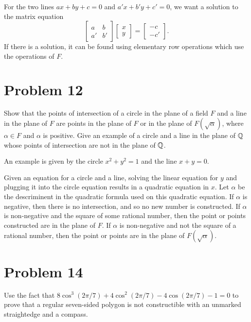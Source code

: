 \documentclass{article}
\begin{document}
For the two lines $ax+by+c=0$ and $a'x+b'y+c'=0$, we want a solution to the
matrix equation
\begin{equation*}
\left[\begin{array}{cc} a & b \\ a' & b' \end{array}\right]
\left[\begin{array}{c} x \\ y \end{array}\right] =
\left[\begin{array}{c} -c \\ -c' \end{array}\right].
\end{equation*}
If there is a solution, it can be found using elementary row operations which use
the operations of $F$.

\section*{Problem 12}

Show that the points of intersection of a circle in the plane of a field $F$
and a line in the plane of $F$ are points in the plane of $F$ or in the plane
of $F(\sqrt{\alpha})$, where $\alpha\in F$ and $\alpha$ is positive.  Give an
example of a circle and a line in the plane of $\mathbb{Q}$ whose points of intersection
are not in the plane of $\mathbb{Q}$.

An example is given by the circle $x^2+y^2=1$ and the line $x+y=0$.

Given an equation for a circle and a line, solving the linear equation for
$y$ and plugging it into the circle equation results in a quadratic equation in $x$.
Let $\alpha$ be the descriminent in the quadratic formula used on this quadratic equation.
If $\alpha$ is negative, then there is no intersection, and so no
new number is constructed.  If $\alpha$ is non-negative and the square
of some rational number, then the point or points constructed are in the plane of $F$.
If $\alpha$ is non-negative and not the square of a rational number,
then the point or points are in the plane of $F(\sqrt{\alpha})$.

\section*{Problem 14}

Use the fact that $8\cos^3(2\pi/7)+4\cos^2(2\pi/7)-4\cos(2\pi/7)-1=0$ to prove
that a regular seven-sided polygon is not constructible with an unmarked
straightedge and a compass.
\end{document}
